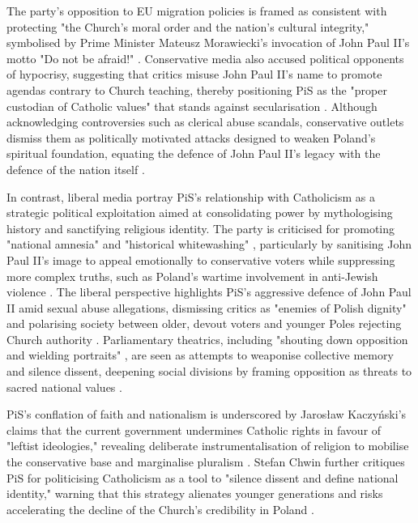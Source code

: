 The party's opposition to EU migration policies is framed as consistent with protecting "the Church's moral order and the nation's cultural integrity," symbolised by Prime Minister Mateusz Morawiecki's invocation of John Paul II's motto "Do not be afraid!" \citep{szuldrzynski_michal_2023}. Conservative media also accused political opponents of hypocrisy, suggesting that critics misuse John Paul II's name to promote agendas contrary to Church teaching, thereby positioning PiS as the "proper custodian of Catholic values" that stands against secularisation \citep{szuldrzynski_michal_2023}. Although acknowledging controversies such as clerical abuse scandals, conservative outlets dismiss them as politically motivated attacks designed to weaken Poland's spiritual foundation, equating the defence of John Paul II's legacy with the defence of the nation itself \citep{kolanko_kampania_2023}.

In contrast, liberal media portray PiS's relationship with Catholicism as a strategic political exploitation aimed at consolidating power by mythologising history and sanctifying religious identity. The party is criticised for promoting "national amnesia" and "historical whitewashing" \citep{mrozek_jak_2023}, particularly by sanitising John Paul II's image to appeal emotionally to conservative voters while suppressing more complex truths, such as Poland's wartime involvement in anti-Jewish violence \citep{mrozek_jak_2023}. The liberal perspective highlights PiS's aggressive defence of John Paul II amid sexual abuse allegations, dismissing critics as "enemies of Polish dignity" and polarising society between older, devout voters and younger Poles rejecting Church authority \citep{gadomski_awantura_2023}. Parliamentary theatrics, including "shouting down opposition and wielding portraits" \citep{wronski_sejm_2023}, are seen as attempts to weaponise collective memory and silence dissent, deepening social divisions by framing opposition as threats to sacred national values \citep{wronski_sejm_2023}.

PiS's conflation of faith and nationalism is underscored by Jarosław Kaczyński's claims that the current government undermines Catholic rights in favour of "leftist ideologies," revealing deliberate instrumentalisation of religion to mobilise the conservative base and marginalise pluralism \citep{kondzinska_pis_2023}. Stefan Chwin further critiques PiS for politicising Catholicism as a tool to "silence dissent and define national identity," warning that this strategy alienates younger generations and risks accelerating the decline of the Church's credibility in Poland \citep{chwin_stefan_2023}.


